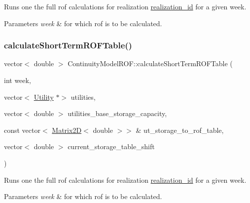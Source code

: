 Runs one the full rof calculations for realization \mbox{\hyperlink{classContinuityModel_a7b6c99bf256f6c6b633ebb78282f43c7_a7b6c99bf256f6c6b633ebb78282f43c7}{realization\+\_\+id}} for a given week. 
\begin{DoxyParams}{Parameters}
{\em week} & for which rof is to be calculated. \\
\hline
\end{DoxyParams}
\mbox{\label{classContinuityModelROF_acd0dd0324718521f49eb344dbba6684d_acd0dd0324718521f49eb344dbba6684d}} 
\subsubsection{\texorpdfstring{calculate\+Short\+Term\+R\+O\+F\+Table()}{calculateShortTermROFTable()}}
{\footnotesize\ttfamily vector$<$ double $>$ Continuity\+Model\+R\+O\+F\+::calculate\+Short\+Term\+R\+O\+F\+Table (\begin{DoxyParamCaption}\item[{int}]{week,  }\item[{vector$<$ \mbox{\hyperlink{classUtility}{Utility}} $\ast$$>$}]{utilities,  }\item[{vector$<$ double $>$}]{utilities\+\_\+base\+\_\+storage\+\_\+capacity,  }\item[{const vector$<$ \mbox{\hyperlink{classMatrix2D}{Matrix2D}}$<$ double $>$$>$ \&}]{ut\+\_\+storage\+\_\+to\+\_\+rof\+\_\+table,  }\item[{vector$<$ double $>$}]{current\+\_\+storage\+\_\+table\+\_\+shift }\end{DoxyParamCaption})}

Runs one the full rof calculations for realization \mbox{\hyperlink{classContinuityModel_a7b6c99bf256f6c6b633ebb78282f43c7_a7b6c99bf256f6c6b633ebb78282f43c7}{realization\+\_\+id}} for a given week. 
\begin{DoxyParams}{Parameters}
{\em week} & for which rof is to be calculated. \\
\hline
\end{DoxyParams}
\mbox{\label{classContinuityModelROF_abc16c650a854b60dfc42ab2d32ef4b0c_abc16c650a854b60dfc42ab2d32ef4b0c}} 
